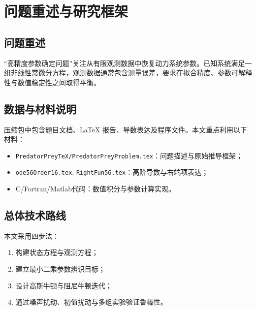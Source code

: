 \chapter{问题重述与研究框架}

\section{问题重述}
“高精度参数确定问题”关注从有限观测数据中恢复动力系统参数。已知系统满足一组非线性常微分方程，观测数据通常包含测量误差，要求在拟合精度、参数可解释性与数值稳定性之间取得平衡。

\section{数据与材料说明}
压缩包中包含题目文档、\LaTeX{} 报告、导数表达及程序文件。本文重点利用以下材料：
\begin{itemize}
  \item \texttt{PredatorPreyTeX/PredatorPreyProblem.tex}：问题描述与原始推导框架；
  \item \texttt{ode56Order16.tex}, \texttt{RightFun56.tex}：高阶导数与右端项表达；
  \item C/Fortran/Matlab代码：数值积分与参数计算实现。
\end{itemize}

\section{总体技术路线}
本文采用四步法：
\begin{enumerate}
  \item 构建状态方程与观测方程；
  \item 建立最小二乘参数辨识目标；
  \item 设计高斯牛顿与阻尼牛顿迭代；
  \item 通过噪声扰动、初值扰动与多组实验验证鲁棒性。
\end{enumerate}
